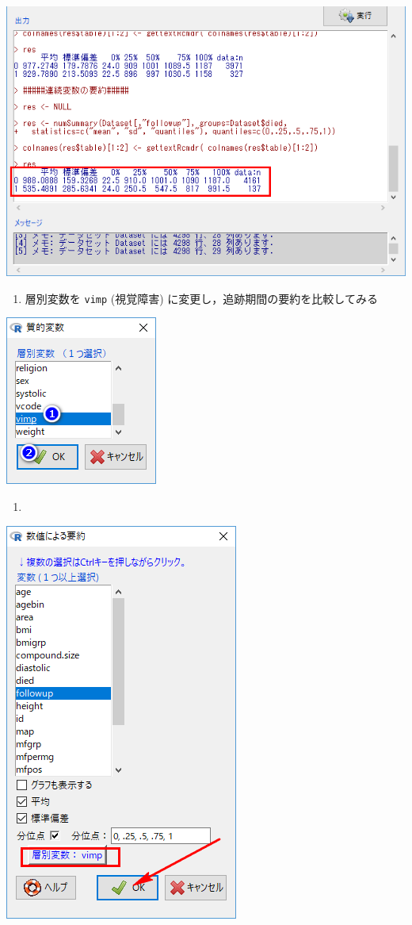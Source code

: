 \documentclass[11pt,]{problemset}
\providecommand{\tightlist}{%
  \setlength{\itemsep}{0pt}\setlength{\parskip}{0pt}}
\begin{document}
\begin{center}\includegraphics[width=0.55\linewidth,height=0.35\textheight]{pic/survival06} \end{center}

\newpage

\begin{enumerate}
\def\labelenumi{\arabic{enumi}.}
\setcounter{enumi}{7}
\tightlist
\item
  層別変数を \texttt{vimp} (視覚障害)
  に変更し，追跡期間の要約を比較してみる
\end{enumerate}

\begin{center}\includegraphics[width=0.25\linewidth,height=0.35\textheight]{pic/survival0901} \end{center}

\begin{enumerate}
\def\labelenumi{\arabic{enumi}.}
\setcounter{enumi}{8}
\item
\end{enumerate}

\begin{center}\includegraphics[width=0.45\linewidth,height=0.35\textheight]{pic/survival0902} \end{center}
\end{document}
